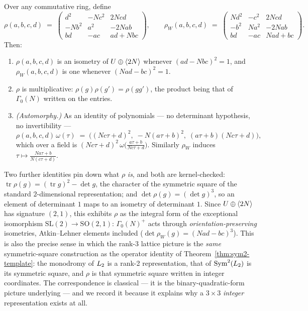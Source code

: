 \begin{proposition}[status (K)]\label{prop:rho}
Over any commutative ring, define
\[
  \rho(a,b,c,d) \;=\;
  \begin{pmatrix}
    d^2 & -Nc^2 & 2Ncd\\
    -Nb^2 & a^2 & -2Nab\\
    bd & -ac & ad+Nbc
  \end{pmatrix},
  \qquad
  \rho_W(a,b,c,d) \;=\;
  \begin{pmatrix}
    Nd^2 & -c^2 & 2Ncd\\
    -b^2 & Na^2 & -2Nab\\
    bd & -ac & Nad+bc
  \end{pmatrix}.
\]
Then:
\begin{enumerate}
\item $\rho(a,b,c,d)$ is an isometry of $U\oplus\langle 2N\rangle$ whenever
  $(ad-Nbc)^2=1$, and $\rho_W(a,b,c,d)$ is one whenever $(Nad-bc)^2=1$.
\item $\rho$ is multiplicative: $\rho(g)\rho(g') = \rho(gg')$, the product being
  that of $\Gamma_0(N)$ written on the entries.
\item \emph{(Automorphy.)} As an identity of polynomials --- no determinant
  hypothesis, no invertibility ---
  \[
    \rho(a,b,c,d)\,\omega(\tau)
      \;=\; \bigl((Nc\tau+d)^2,\; -N(a\tau+b)^2,\; (a\tau+b)(Nc\tau+d)\bigr),
  \]
  which over a field is $(Nc\tau+d)^2\,\omega\!\bigl(\tfrac{a\tau+b}{Nc\tau+d}\bigr)$.
  Similarly $\rho_W$ induces $\tau\mapsto\frac{Na\tau+b}{N(c\tau+d)}$.
\end{enumerate}
\end{proposition}

Two further identities pin down what $\rho$ \emph{is}, and both are
kernel-checked: $\operatorname{tr}\rho(g) = (\operatorname{tr}g)^2-\det g$, the
character of the symmetric square of the standard $2$-dimensional
representation; and $\det\rho(g) = (\det g)^3$, so an element of determinant $1$
maps to an isometry of determinant $1$. Since $U\oplus\langle 2N\rangle$ has signature
$(2,1)$, this exhibits $\rho$ as the integral form of the exceptional
isomorphism $\mathrm{SL}(2)\to\mathrm{SO}(2,1)$: $\Gamma_0(N)^{+}$ acts through
\emph{orientation-preserving} isometries, Atkin--Lehner elements included
($\det\rho_W(g)=(Nad-bc)^3$). This is also the precise sense in which the rank-3
lattice picture is the \emph{same} symmetric-square construction as the operator
identity of Theorem~\ref{thm:sym2-template}: the monodromy of $L_2$ is a
rank-2 representation, that of $\operatorname{Sym}^2(L_2)$ is its symmetric square, and
$\rho$ is that symmetric square written in integer coordinates. The
correspondence is classical --- it is the binary-quadratic-form picture
underlying \cite{Dolgachev1996} --- and we record it because it explains why a
$3\times3$ \emph{integer} representation exists at all.

